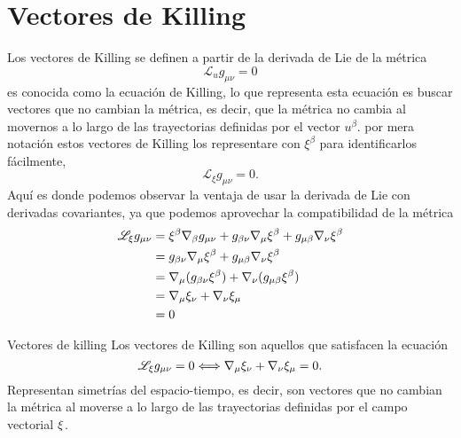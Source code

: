 \section{Vectores de Killing}
\noindent Los vectores de Killing se definen a partir de la derivada de Lie de la métrica
\begin{equation}
    \mathscr{L}_u g_{\mu \nu} =0
\end{equation}
es conocida como la ecuación de Killing, lo que representa esta ecuación es buscar vectores que no cambian la métrica, es decir, que la métrica no cambia al movernos a lo largo de las trayectorias definidas por el vector $u^\beta$.
por mera notación estos vectores de Killing los representare con $\xi ^\beta$ para identificarlos fácilmente,
\begin{equation}
    \mathscr{L}_\xi g_{\mu \nu} =0.
\end{equation}
Aquí es donde podemos observar la ventaja de usar la derivada de Lie con derivadas covariantes, ya que podemos aprovechar la compatibilidad de la métrica
\begin{equation}
    \begin{aligned}
        \mathscr{L}_\xi g_{\mu \nu} & = \xi^\beta \mathbf{\nabla}_\beta g_{\mu \nu} +g_{\beta \nu}\mathbf{\nabla}_\mu \xi^\beta +g_{\mu \beta } \mathbf{\nabla}_\nu \xi^\beta \\
                                    & = g_{\beta \nu}\mathbf{\nabla}_\mu \xi^\beta +g_{\mu \beta } \mathbf{\nabla}_\nu \xi^\beta                                         \\
                                    & = \mathbf{\nabla}_\mu (g_{\beta \nu} \xi^\beta) + \mathbf{\nabla}_\nu (g_{\mu \beta } \xi^\beta)                                   \\
                                    & = \mathbf{\nabla}_\mu  \xi_\nu + \mathbf{\nabla}_\nu \xi_\mu                                                                       \\
                                    & =0                                                                                                                       \\
    \end{aligned}
\end{equation}
\begin{definition}{Vectores de killing}{}
    Los vectores de Killing son aquellos que satisfacen la ecuación
    \begin{equation}
        \mathscr{L}_\xi g_{\mu \nu} =0   \Longleftrightarrow   \mathbf{\nabla}_\mu  \xi_\nu + \mathbf{\nabla}_\nu \xi_\mu
        =0      .
        \label{eq:killing}
    \end{equation}
    Representan simetrías del espacio-tiempo, es decir, son vectores que no cambian la métrica al moverse a lo largo de las trayectorias definidas por el campo vectorial $\mathbf{\xi}$.

\end{definition}
